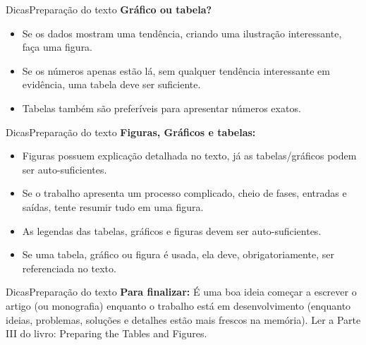 \documentclass[t]{beamer}
\begin{document}



\begin{ftst}{Dicas}{Preparação do texto}
\justifying
\textbf{Gráfico ou tabela?}
\vone
\begin{itemize}
    \item Se os dados mostram uma tendência, criando uma ilustração interessante, faça uma figura.
    \item Se os números apenas estão lá, sem qualquer tendência interessante em evidência, uma tabela deve ser suficiente.
    \item Tabelas também são preferíveis para apresentar números exatos.
\end{itemize}

\end{ftst}




\begin{ftst}{Dicas}{Preparação do texto}
\justifying
\textbf{Figuras, Gráficos e tabelas:}
\vone
\begin{itemize}
    \item Figuras possuem explicação detalhada no texto, já as tabelas/gráficos podem ser auto-suficientes.
    \item Se o trabalho apresenta um processo complicado, cheio de fases, entradas e saídas, tente resumir tudo em uma figura.
    \item As legendas das tabelas, gráficos e figuras devem ser auto-suficientes. 
    \item Se uma tabela, gráfico ou figura é usada, ela deve, obrigatoriamente, ser referenciada no texto.
\end{itemize}

\end{ftst}




\begin{ftst}{Dicas}{Preparação do texto}
\justifying
\textbf{Para finalizar:}
\vone
É uma boa ideia começar a escrever o artigo (ou monografia) enquanto o trabalho está em desenvolvimento (enquanto ideias, problemas, soluções e detalhes estão mais frescos na memória). 
\vone
Ler a Parte III do livro: Preparing the Tables and Figures.

\end{ftst}
\end{document}

